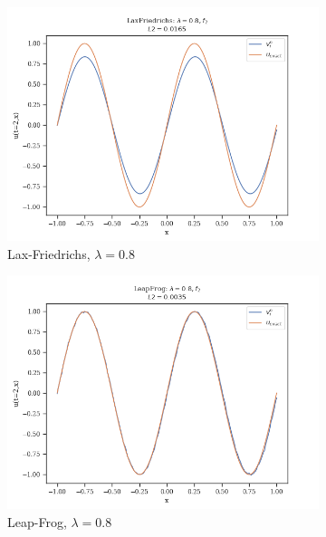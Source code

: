 \begin{figure}
\begin{subfigure}{0.3\linewidth}
        \includegraphics[width=\linewidth]{figures/LaxFriedrichs/LaxFriedrichs_lambda=0.8,f2}
        \caption{Lax-Friedrichs, $\lambda =0.8$}
    \end{subfigure}
    \hfill
    \begin{subfigure}{0.3\linewidth}
        \centering
        \includegraphics[width=\linewidth]{figures/LeapFrog/LeapFrog_lambda=0.8,f2}
        \caption{Leap-Frog, $\lambda =0.8$}
    \end{subfigure}
    \hfill
    \vspace{1cm}
    \begin{subfigure}{0.3\linewidth}
        \centering

\end{subfigure}
\end{figure}
